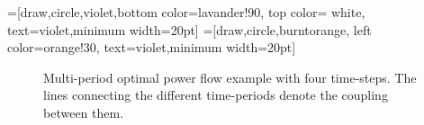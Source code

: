 
\def\lav{lavander!90}
\def\oran{orange!30}

=[draw,circle,violet,bottom color=\lav,
                  top color= white, text=violet,minimum width=20pt]
=[draw,circle,burntorange, left color=\oran,
                       text=violet,minimum width=20pt]

\begin{figure}[h!]
\centering
{}
\caption{Multi-period optimal power flow example with four time-steps. The lines connecting the different time-periods denote the coupling between them.}
\label{fig:tcopflow}
\end{figure}